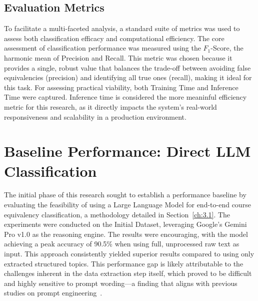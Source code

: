 \subsection{Evaluation Metrics}\label{ch:4.1.3}
To facilitate a multi-faceted analysis, a standard suite of metrics was used to assess both classification efficacy and computational efficiency. The core assessment of classification performance was measured using the \(F_1\)-Score, the harmonic mean of Precision and Recall. This metric was chosen because it provides a single, robust value that balances the trade-off between avoiding false equivalencies (precision) and identifying all true ones (recall), making it ideal for this task. For assessing practical viability, both Training Time and Inference Time were captured. Inference time is considered the more meaninful efficiency metric for this research, as it directly impacts the system's real-world responsiveness and scalability in a production environment.

\section{Baseline Performance: Direct LLM Classification}\label{ch:4.2}
The initial phase of this research sought to establish a performance baseline by evaluating the feasibility of using a Large Language Model for end-to-end course equivalency classification, a methodology detailed in Section~\ref{ch:3.1}. The experiments were conducted on the Initial Dataset, leveraging Google's Gemini Pro v1.0 as the reasoning engine. The results were encouraging, with the model achieving a peak accuracy of 90.5\% when using full, unprocessed raw text as input. This approach consistently yielded superior results compared to using only extracted structured topics. This performance gap is likely attributable to the challenges inherent in the data extraction step itself, which proved to be difficult and highly sensitive to prompt wording---a finding that aligns with previous studies on prompt engineering~\cite{Sclar2023QuantifyingLM,Errica2024WhatDI,Chen2024LLMAA,Cheung2024ARC,Gerych2024WhoKT}.

